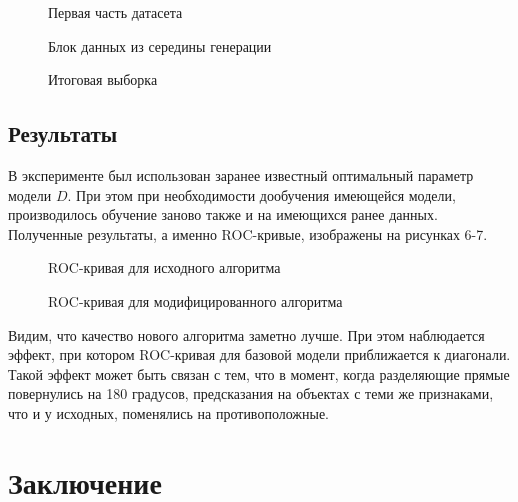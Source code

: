 \documentclass[12pt,twoside]{article}
\begin{document}
\begin{figure}
        \caption{\label{fig:my-label} Первая часть датасета}
\end{figure}

\begin{figure}
        \caption{\label{fig:my-label} Блок данных из середины генерации}
\end{figure}

\begin{figure}
        \caption{\label{fig:my-label} Итоговая выборка}
\end{figure}


\subsection {Результаты}

В эксперименте был использован заранее известный оптимальный параметр модели $D$. При этом при необходимости дообучения имеющейся модели, производилось обучение заново также и на имеющихся ранее данных. Полученные результаты, а именно  ROC-кривые, изображены на рисунках 6-7.

\begin{figure}
        \caption{\label{fig:my-label} ROC-кривая для исходного алгоритма}
\end{figure}

\begin{figure}
        \caption{\label{fig:my-label} ROC-кривая для модифицированного алгоритма}
\end{figure}

Видим, что качество нового алгоритма заметно лучше. При этом наблюдается эффект, при котором ROC-кривая для базовой модели приближается к диагонали. Такой эффект может быть связан с тем, что в момент, когда разделяющие прямые повернулись на 180 градусов, предсказания на объектах с теми же признаками, что и у исходных, поменялись на противоположные.

\section {Заключение}
\end{document}
